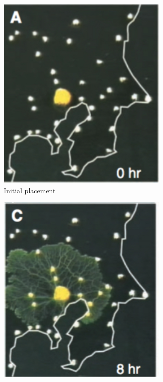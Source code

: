 \documentclass[english,a4paper,twoside]{ppfcmthesis}
\begin{document}
\begin{figure}
  \centering
  \begin{subfigure}{0.33\textwidth}
    \centering
    \includegraphics[width=0.9\textwidth]{background/physarum/network_initial.jpg}
    \caption{Initial placement}
    \label{figure:bp_network_initial}
  \end{subfigure}
  \begin{subfigure}{0.33\textwidth}
    \centering
    \includegraphics[width=0.9\textwidth]{background/physarum/network_intermediate_a.jpg}

\end{subfigure}
\end{figure}
\end{document}
